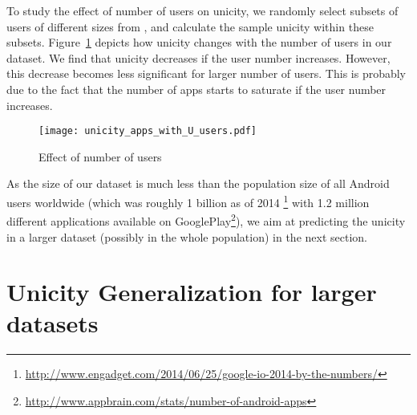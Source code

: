 \documentclass{acm_proc_article-sp}
\theoremstyle{plain}
\theoremstyle{plain}
\theoremstyle{plain}
\theoremstyle{plain}
\theoremstyle{plain}
\theoremstyle{plain}
\begin{document}
To study the effect of number of users on unicity, we randomly select subsets of users of different sizes from , and calculate the sample unicity within these subsets. 
Figure~\ref{fig:unicity_changes_with_users} depicts how unicity changes with the number of users in our dataset.
We find that unicity decreases if the user number increases.
However, this decrease becomes less significant for larger number of users.
This is probably due to the fact that the number of apps starts to saturate if the user number increases.
\begin{figure}[!t]
        \centering
	\texttt{[image: unicity\_apps\_with\_U\_users.pdf]}
	\caption{Effect of number of users}
	\label{fig:unicity_changes_with_users}
\end{figure}


As the size of our dataset is much less than the population size of all Android users worldwide (which was roughly 1 billion as of 2014 \footnote{\url{http://www.engadget.com/2014/06/25/google-io-2014-by-the-numbers/}} with 1.2 million different applications available on GooglePlay\footnote{\url{http://www.appbrain.com/stats/number-of-android-apps}}), we aim at predicting the unicity in a larger dataset (possibly in the whole population) in the next section. 




























\section{Unicity Generalization for larger datasets}
\end{document}
